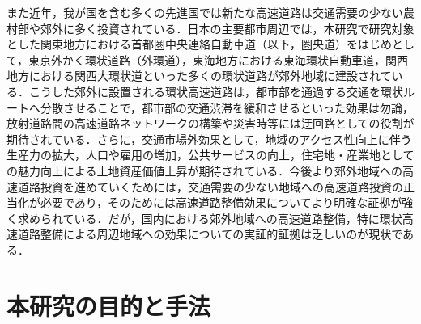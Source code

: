 また近年，我が国を含む多くの先進国では新たな高速道路は交通需要の少ない農村部や郊外に多く投資されている．日本の主要都市周辺では，本研究で研究対象とした関東地方における首都圏中央連絡自動車道（以下，圏央道）をはじめとして，東京外かく環状道路（外環道），東海地方における東海環状自動車道，関西地方における関西大環状道といった多くの環状道路が郊外地域に建設されている．こうした郊外に設置される環状高速道路は，都市部を通過する交通を環状ルートへ分散させることで，都市部の交通渋滞を緩和させるといった効果は勿論，放射道路間の高速道路ネットワークの構築や災害時等には迂回路としての役割が期待されている．さらに，交通市場外効果として，地域のアクセス性向上に伴う生産力の拡大，人口や雇用の増加，公共サービスの向上，住宅地・産業地としての魅力向上による土地資産価値上昇が期待されている．今後より郊外地域への高速道路投資を進めていくためには，交通需要の少ない地域への高速道路投資の正当化が必要であり，そのためには高速道路整備効果についてより明確な証拠が強く求められている．だが，国内における郊外地域への高速道路整備，特に環状高速道路整備による周辺地域への効果についての実証的証拠は乏しいのが現状である．
\section{本研究の目的と手法}

